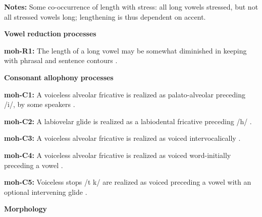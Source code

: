 \documentclass[output=paper]{langsci/langscibook}
\begin{document}
\begin{styleBody}
\textbf{Notes:} Some co-occurrence of length with stress: all long vowels stressed, but not all stressed vowels long; lengthening is thus dependent on accent.
\end{styleBody}

\begin{styleBody}
\textbf{Vowel} \textbf{reduction} \textbf{processes}
\end{styleBody}

\begin{styleBody}
\textbf{moh-R1:} The length of a long vowel may be somewhat diminished in keeping with phrasal and sentence contours \citep[46]{Bonvillain1973}.
\end{styleBody}

\begin{styleBody}
\textbf{Consonant} \textbf{allophony} \textbf{processes}
\end{styleBody}

\begin{styleBody}
\textbf{moh-C1:} A voiceless alveolar fricative is realized as palato-alveolar preceding /i/, by some speakers \citep[31]{Bonvillain1973}.
\end{styleBody}

\begin{styleBody}
\textbf{moh-C2:} A labiovelar glide is realized as a labiodental fricative preceding /h/ \citep[34]{Bonvillain1973}.
\end{styleBody}

\begin{styleBody}
\textbf{moh-C3:} A voiceless alveolar fricative is realized as voiced intervocalically \citep{Bonvillain1973}.
\end{styleBody}

\begin{styleBody}
\textbf{moh-C4:} A voiceless alveolar fricative is realized as voiced word-initially preceding a vowel \citep{Bonvillain1973}.
\end{styleBody}

\begin{styleBody}
\textbf{moh-C5:} Voiceless stops /t k/ are realized as voiced preceding a vowel with an optional intervening glide \citep[28]{Bonvillain1973}.
\end{styleBody}

\begin{styleBody}
\textbf{Morphology}
\end{styleBody}
\end{document}
